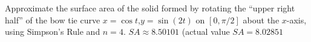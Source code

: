 {Approximate the surface area of the solid formed by rotating the ``upper right half'' of the bow tie curve $x=\cos t$,\quad $y=\sin(2t)$ on $[0,\pi/2]$ about the $x$-axis, using Simpson's Rule and $n=4$.
}
{$SA\approx 8.50101$ (actual value $SA = 8.02851$}
